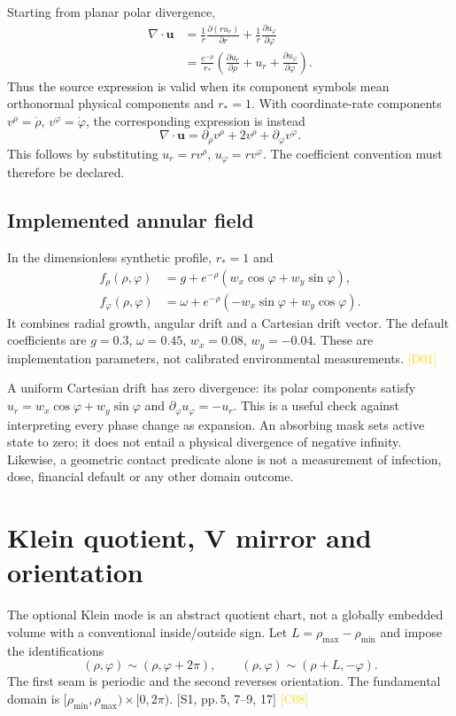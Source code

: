 \documentclass[11pt,a4paper]{article}
\newcommand{\src}[2]{\textcolor{muted}{[#1, #2]}}
\newcommand{\corr}[1]{\textcolor{gold}{\textsf{[#1]}}}
\newcommand{\ph}{\varphi}
\begin{document}
Starting from planar polar divergence,
\begin{align}
 \nabla\!\cdot\mathbf u
 &=\frac1r\frac{\partial(ru_r)}{\partial r}
   +\frac1r\frac{\partial u_\ph}{\partial\ph}\\
 &=\frac{e^{-\rho}}{r_*}
 \left(\frac{\partial u_r}{\partial\rho}+u_r+
       \frac{\partial u_\ph}{\partial\ph}\right).
\end{align}
Thus the source expression is valid when its component symbols mean orthonormal physical components and $r_*=1$. With coordinate-rate components $v^\rho=\dot\rho$, $v^\ph=\dot\ph$, the corresponding expression is instead
\begin{equation}
 \nabla\!\cdot\mathbf u
 =\partial_\rho v^\rho+2v^\rho+\partial_\ph v^\ph.
\end{equation}
This follows by substituting $u_r=rv^\rho$, $u_\ph=rv^\ph$. The coefficient convention must therefore be declared.

\subsection{Implemented annular field}
In the dimensionless synthetic profile, $r_*=1$ and
\begin{align}
 f_\rho(\rho,\ph)&=g+e^{-\rho}(w_x\cos\ph+w_y\sin\ph),\\
 f_\ph(\rho,\ph)&=\omega+e^{-\rho}(-w_x\sin\ph+w_y\cos\ph).
\end{align}
It combines radial growth, angular drift and a Cartesian drift vector. The default coefficients are $g=0.3$, $\omega=0.45$, $w_x=0.08$, $w_y=-0.04$. These are implementation parameters, not calibrated environmental measurements. \corr{D01}

A uniform Cartesian drift has zero divergence: its polar components satisfy $u_r=w_x\cos\ph+w_y\sin\ph$ and $\partial_\ph u_\ph=-u_r$. This is a useful check against interpreting every phase change as expansion. An absorbing mask sets active state to zero; it does not entail a physical divergence of negative infinity. Likewise, a geometric contact predicate alone is not a measurement of infection, dose, financial default or any other domain outcome.
\clearpage

\section{Klein quotient, V mirror and orientation}
The optional Klein mode is an abstract quotient chart, not a globally embedded volume with a conventional inside/outside sign. Let $L=\rho_{\max}-\rho_{\min}$ and impose the identifications
\begin{equation}
 (\rho,\ph)\sim(\rho,\ph+2\pi),\qquad
 (\rho,\ph)\sim(\rho+L,-\ph).
\end{equation}
The first seam is periodic and the second reverses orientation. The fundamental domain is $[\rho_{\min},\rho_{\max})\times[0,2\pi)$. \src{S1}{pp.\,5, 7--9, 17} \corr{C08}
\end{document}
